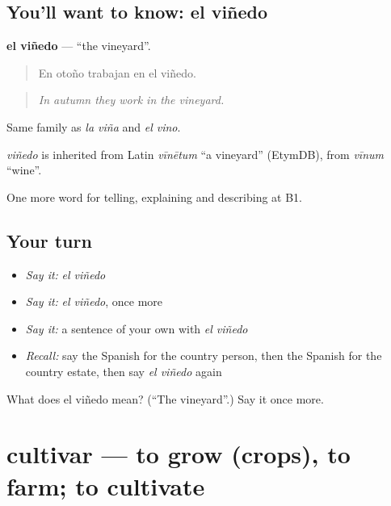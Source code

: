 \subsection*{You'll want to know: el viñedo}
\textbf{el viñedo} — \textquotedblleft{}the vineyard\textquotedblright{}.

\begin{quote}
En otoño trabajan en el viñedo.
\end{quote}

\begin{quote}
\emph{In autumn they work in the vineyard.}
\end{quote}

Same family as \emph{la viña} and \emph{el vino}.

\begin{cousinweb}
\emph{viñedo} is inherited from Latin \emph{vīnētum} \textquotedblleft{}a vineyard\textquotedblright{} (EtymDB), from \emph{vīnum} \textquotedblleft{}wine\textquotedblright{}.
\end{cousinweb}

\begin{grammarlens}[title={What you've built}]
One more word for telling, explaining and describing at B1.
\end{grammarlens}

\subsection*{Your turn}
\begin{itemize}
\raggedright
  \item \emph{Say it:} \emph{el viñedo}
  \item \emph{Say it:} \emph{el viñedo}, once more
  \item \emph{Say it:} a sentence of your own with \emph{el viñedo}
  \item \emph{Recall:} say the Spanish for the country person, then the Spanish for the country estate, then say \emph{el viñedo} again
\end{itemize}

\begin{tcolorbox}[breakable,colback=teal!4,colframe=teal!35!black,title={Before you move on}]
What does el viñedo mean? (\textquotedblleft{}The vineyard\textquotedblright{}.) Say it once more.
\end{tcolorbox}
\section[cultivar]{cultivar — to grow (crops), to farm; to cultivate}

